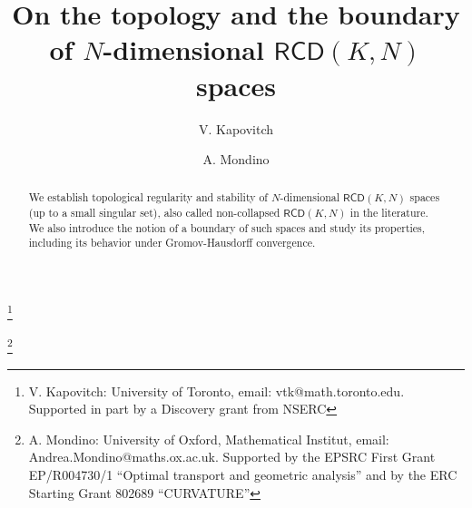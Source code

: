 \documentclass[a4paper]{amsart}
\theoremstyle{plain}
\theoremstyle{definition}
\numberwithin{equation}{section}
\newcommand{\RCD}{\mathsf{RCD}}
\begin{document}
\title[On the topology and the boundary of $N$-dimensional $\RCD(K,N)$ spaces]{ On the topology and the boundary of $N$-dimensional $\RCD(K,N)$ spaces }
%
\author{V. Kapovitch}  \thanks{V. Kapovitch: University of Toronto, email: vtk@math.toronto.edu. Supported in part by a Discovery grant from NSERC}



\author{A. Mondino}  \thanks{A.  Mondino: University of Oxford,  Mathematical Institut,  email:  Andrea.Mondino@maths.ox.ac.uk. Supported by the EPSRC First Grant  EP/R004730/1 ``Optimal transport and
geometric analysis''  and by the  ERC Starting Grant 802689 ``CURVATURE''}
%



\maketitle

\begin{abstract} 
 We establish topological regularity and stability of $N$-dimensional $\RCD(K,N)$ spaces (up to a small singular set), also called non-collapsed $\RCD(K,N)$ in the literature. We also introduce the notion of a boundary of such spaces and study its properties, including its behavior under Gromov-Hausdorff convergence.
\end{abstract}

\tableofcontents
\end{document}
